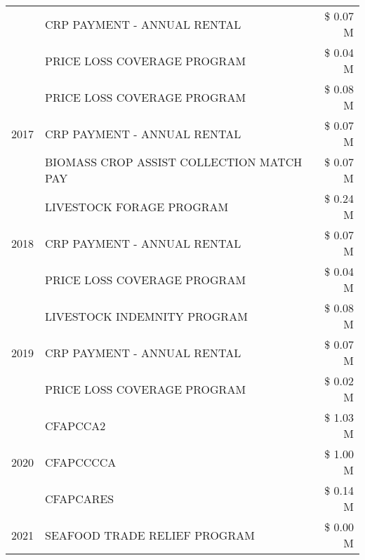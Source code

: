 \begin{tabular}{llr}
 & CRP PAYMENT - ANNUAL RENTAL & \$ 0.07 M \\
 & PRICE LOSS COVERAGE PROGRAM & \$ 0.04 M \\
\cline{1-3}
\multirow[t]{3}{*}{2017} & PRICE LOSS COVERAGE PROGRAM & \$ 0.08 M \\
 & CRP PAYMENT - ANNUAL RENTAL & \$ 0.07 M \\
 & BIOMASS CROP ASSIST COLLECTION MATCH PAY & \$ 0.07 M \\
\cline{1-3}
\multirow[t]{3}{*}{2018} & LIVESTOCK FORAGE PROGRAM & \$ 0.24 M \\
 & CRP PAYMENT - ANNUAL RENTAL & \$ 0.07 M \\
 & PRICE LOSS COVERAGE PROGRAM & \$ 0.04 M \\
\cline{1-3}
\multirow[t]{3}{*}{2019} & LIVESTOCK INDEMNITY PROGRAM & \$ 0.08 M \\
 & CRP PAYMENT - ANNUAL RENTAL & \$ 0.07 M \\
 & PRICE LOSS COVERAGE PROGRAM & \$ 0.02 M \\
\cline{1-3}
\multirow[t]{3}{*}{2020} & CFAPCCA2 & \$ 1.03 M \\
 & CFAPCCCCA & \$ 1.00 M \\
 & CFAPCARES & \$ 0.14 M \\
\cline{1-3}
2021 & SEAFOOD TRADE RELIEF PROGRAM & \$ 0.00 M \\
\cline{1-3}
\bottomrule
\end{tabular}

